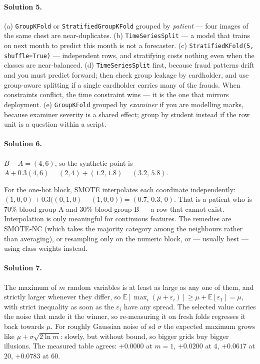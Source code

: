 \documentclass[11pt]{article}
\begin{document}
\paragraph{Solution 5.}
(a) \texttt{GroupKFold} or \texttt{StratifiedGroupKFold} grouped by
\emph{patient} --- four images of the same chest are near-duplicates.
(b) \texttt{TimeSeriesSplit} --- a model that trains on next month to predict
this month is not a forecaster.
(c) \texttt{StratifiedKFold(5, shuffle=True)} --- independent rows, and
stratifying costs nothing even when the classes are near-balanced.
(d) \texttt{TimeSeriesSplit} first, because fraud patterns drift and you must
predict forward; then check group leakage by cardholder, and use group-aware
splitting if a single cardholder carries many of the frauds. When constraints
conflict, the time constraint wins --- it is the one that mirrors deployment.
(e) \texttt{GroupKFold} grouped by \emph{examiner} if you are modelling marks,
because examiner severity is a shared effect; group by student instead if the
row unit is a question within a script.

\paragraph{Solution 6.} $B - A = (4, 6)$, so the synthetic point is
$A + 0.3(4,6) = (2, 4) + (1.2, 1.8) = (3.2,\, 5.8)$.

For the one-hot block, SMOTE interpolates each coordinate independently:
$(1,0,0) + 0.3\big((0,1,0) - (1,0,0)\big) = (0.7,\, 0.3,\, 0)$. That is a
patient who is $70\%$ blood group A and $30\%$ blood group B --- a row that
cannot exist. Interpolation is only meaningful for continuous features. The
remedies are SMOTE-NC (which takes the majority category among the neighbours
rather than averaging), or resampling only on the numeric block, or ---
usually best --- using class weights instead.

\paragraph{Solution 7.} The maximum of $m$ random variables is at least as
large as any one of them, and strictly larger whenever they differ, so
$\mathbb{E}[\max_i(\mu + \varepsilon_i)] \ge \mu + \mathbb{E}[\varepsilon_1]
= \mu$, with strict inequality as soon as the $\varepsilon_i$ have any spread.
The selected value carries the noise that made it the winner, so re-measuring
it on fresh folds regresses it back towards $\mu$. For roughly Gaussian noise
of sd $\sigma$ the expected maximum grows like $\mu + \sigma\sqrt{2\ln m}$:
slowly, but without bound, so bigger grids buy bigger illusions. The measured
table agrees: $+0.0000$ at $m = 1$, $+0.0200$ at $4$, $+0.0617$ at $20$,
$+0.0783$ at $60$.
\end{document}
